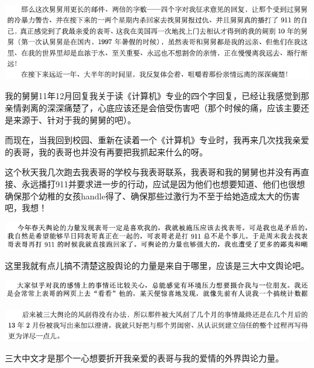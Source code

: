 \documentclass[9pt, b5paper]{article}
\begin{document}
\begin{center}
\includegraphics[width=.9\linewidth]{./pic/backups_plans_20210506_101409.png}
\end{center}

我的舅舅11年12月回复我关于读《计算机》专业的四个字回复，已经让我感觉到那亲情剥离的深深痛楚了，心底应该还是会倍受伤害吧（那个时候的痛，应该主要还是来源于、针对于我的舅舅的吧）。

而现在，当我回到校园、重新在读着一个《计算机》专业时，我再来几次找我亲爱的表哥，我的表哥也并没有再要把我抓起来什么的呀。

这个秋天我几次跑去我表哥的学校与我表哥联系，我表哥和我的舅舅也并没有再直接、永远播打911并要求进一步的行动，应试是因为他们也想要知道、他们也很想确保那个幼稚的女孩handle得了、确保那些过激行为不至于给她造成太大的伤害吧，我想！

\begin{center}
\includegraphics[width=.9\linewidth]{./pic/backups_plans_20210505_205552.png}
\end{center}

这里我就有点儿搞不清楚这股舆论的力量是来自于哪里，应该是三大中文舆论吧。

\begin{center}
\includegraphics[width=.9\linewidth]{./pic/backups_plans_20210506_112740.png}
\end{center}

\begin{center}
\includegraphics[width=.9\linewidth]{./pic/backups_plans_20210506_112956.png}
\end{center}

三大中文才是那个一心想要折开我亲爱的表哥与我的爱情的外界舆论力量。
\end{document}
